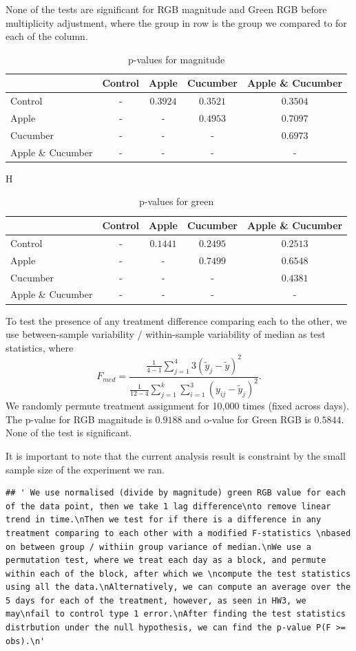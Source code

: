 \documentclass[
  12pt,
]{article}
\begin{document}
None of the tests are significant for RGB magnitude and Green RGB before
multiplicity adjustment, where the group in row is the group we compared
to for each of the column.

\begin{table}[H]
\begin{tabular}{l|cccc}
 & Control & Apple & Cucumber & Apple \& Cucumber \\
 \hline
Control & - & $0.3924$ & $0.3521$ & $0.3504$ \\
Apple & - & - & $0.4953$ & $0.7097$ \\
Cucumber & - & - & - & $0.6973$ \\
Apple \& Cucumber & - & - & - & - \\
\hline
\end{tabular}
\caption{p-values for magnitude}
\end{table}

\begin{table}{H}
\begin{tabular}{l|cccc}
 & Control & Apple & Cucumber & Apple \& Cucumber \\
 \hline
Control & - & $0.1441$ & $0.2495$ & $0.2513$ \\
Apple & - & - & $0.7499$ & $0.6548$ \\
Cucumber & - & - & - & $0.4381$ \\
Apple \& Cucumber & - & - & - & - \\
\hline
\end{tabular}
\caption{p-values for green}
\end{table}

To test the presence of any treatment difference comparing each to the
other, we use between-sample variability / within-sample variability of
median as test statistics, where \[
F_{m e d}=\frac{\frac{1}{4-1} \sum_{j=1}^4 3\left(\tilde{y}_j-\tilde{y}\right)^2}{\frac{1}{12-4} \sum_{j=1}^k \sum_{i=1}^3\left(y_{i j}-\tilde{y}_j\right)^2}.
\] We randomly permute treatment assignment for 10,000 times (fixed
across days). The p-value for RGB magnitude is \(0.9188\) and o-value
for Green RGB is \(0.5844\). None of the test is significant.

It is important to note that the current analysis result is constraint
by the small sample size of the experiment we ran.

\begin{verbatim}
## ' We use normalised (divide by magnitude) green RGB value for each of the data point, then we take 1 lag difference\nto remove linear trend in time.\nThen we test for if there is a difference in any treatment comparing to each other with a modified F-statistics \nbased on between group / withiin group variance of median.\nWe use a permutation test, where we treat each day as a block, and permute within each of the block, after which we \ncompute the test statistics using all the data.\nAlternatively, we can compute an average over the 5 days for each of the treatment, however, as seen in HW3, we may\nfail to control type 1 error.\nAfter finding the test statistics distrbution under the null hypothesis, we can find the p-value P(F >= obs).\n'
\end{verbatim}
\end{document}
